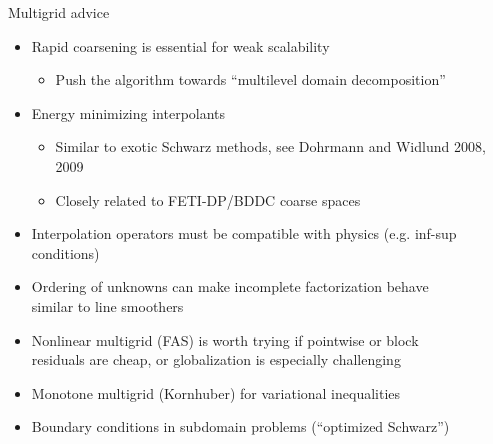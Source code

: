 \begin{frame}{Multigrid advice}
  \begin{itemize}
  \item Rapid coarsening is essential for weak scalability
    \begin{itemize}
    \item Push the algorithm towards ``multilevel domain decomposition''
    \end{itemize}
  \item Energy minimizing interpolants
    \begin{itemize}
    \item Similar to exotic Schwarz methods, see Dohrmann and Widlund 2008, 2009
    \item Closely related to FETI-DP/BDDC coarse spaces
    \end{itemize}
  \item Interpolation operators must be compatible with physics (e.g. inf-sup conditions)
  \item Ordering of unknowns can make incomplete factorization behave \\
    similar to line smoothers
  \item Nonlinear multigrid (FAS) is worth trying if pointwise or block \\
    residuals are cheap, or globalization is especially challenging
  \item Monotone multigrid (Kornhuber) for variational inequalities
  \item Boundary conditions in subdomain problems (``optimized Schwarz'')
  \end{itemize}
\end{frame}
